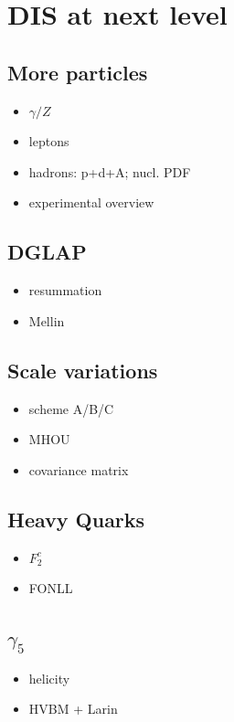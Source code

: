 \chapter{DIS at next level}
\section{More particles}
\begin{itemize}
    \item $\gamma/Z$
    \item leptons
    \item hadrons: p+d+A; nucl. PDF
    \item experimental overview
\end{itemize}

\section{DGLAP}
\begin{itemize}
    \item resummation
    \item Mellin
\end{itemize}

\section{Scale variations}
\begin{itemize}
    \item scheme A/B/C
    \item MHOU
    \item covariance matrix
\end{itemize}

\section{Heavy Quarks}
\begin{itemize}
    \item $F_2^c$
    \item FONLL
\end{itemize}

\section{$\gamma_5$}
\begin{itemize}
    \item helicity
    \item HVBM + Larin
\end{itemize}

